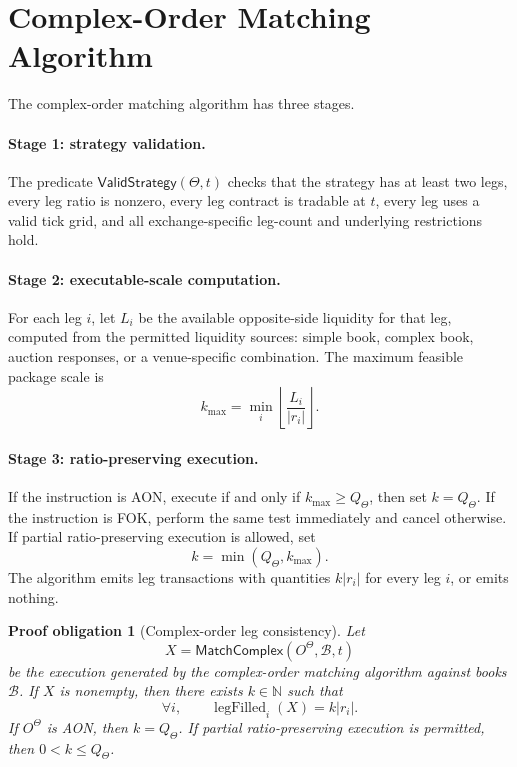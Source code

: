\documentclass[11pt]{article}
\newtheorem{proofobligation}[definition]{Proof obligation}
\newcommand{\legfilled}{\operatorname{legFilled}}
\begin{document}
\section{Complex-Order Matching Algorithm}

The complex-order matching algorithm has three stages.

\paragraph{Stage 1: strategy validation.}
The predicate \(\mathsf{ValidStrategy}(\Theta,t)\) checks that the strategy has at least two legs, every leg ratio is nonzero, every leg contract is tradable at \(t\), every leg uses a valid tick grid, and all exchange-specific leg-count and underlying restrictions hold.

\paragraph{Stage 2: executable-scale computation.}
For each leg \(i\), let \(L_i\) be the available opposite-side liquidity for that leg, computed from the permitted liquidity sources: simple book, complex book, auction responses, or a venue-specific combination. The maximum feasible package scale is
\[
k_{\max}=\min_i\left\lfloor\frac{L_i}{|r_i|}\right\rfloor.
\]

\paragraph{Stage 3: ratio-preserving execution.}
If the instruction is AON, execute if and only if \(k_{\max}\ge Q_\Theta\), then set \(k=Q_\Theta\). If the instruction is FOK, perform the same test immediately and cancel otherwise. If partial ratio-preserving execution is allowed, set
\[
k=\min(Q_\Theta,k_{\max}).
\]
The algorithm emits leg transactions with quantities \(k|r_i|\) for every leg \(i\), or emits nothing.

\begin{proofobligation}[Complex-order leg consistency]
Let
\[
X=\mathsf{MatchComplex}(O^\Theta,\mathcal B,t)
\]
be the execution generated by the complex-order matching algorithm against books \(\mathcal B\). If \(X\) is nonempty, then there exists \(k\in\mathbb N\) such that
\[
\forall i,
\qquad
\legfilled_i(X)=k|r_i|.
\]
If \(O^\Theta\) is AON, then \(k=Q_\Theta\). If partial ratio-preserving execution is permitted, then \(0<k\le Q_\Theta\).
\end{proofobligation}
\end{document}
